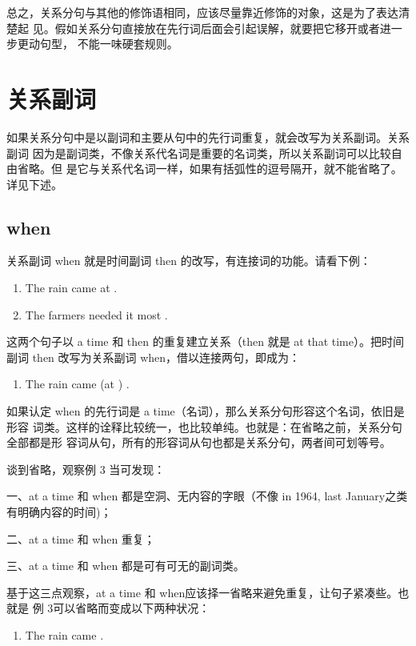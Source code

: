 总之，关系分句与其他的修饰语相同，应该尽量靠近修饰的对象，这是为了表达清楚起
见。假如关系分句直接放在先行词后面会引起误解，就要把它移开或者进一步更动句型，
不能一味硬套规则。

\section{关系副词}

如果关系分句中是以副词和主要从句中的先行词重复，就会改写为关系副词。关系副词
因为是副词类，不像关系代名词是重要的名词类，所以关系副词可以比较自由省略。但
是它与关系代名词一样，如果有括弧性的逗号隔开，就不能省略了。详见下述。

\subsection{when}

关系副词 when 就是时间副词 then 的改写，有连接词的功能。请看下例：

\begin{enumerate}
\item The rain came at .
\item The farmers needed it most .
\end{enumerate}
这两个句子以 a time 和 then 的重复建立关系（then 就是 at that time）。把时间
副词 then 改写为关系副词 when，借以连接两句，即成为：

\begin{enumerate}[resume]
\item The rain came (at ) .
\end{enumerate}
如果认定 when 的先行词是 a time（名词），那么关系分句形容这个名词，依旧是形容
词类。这样的诠释比较统一，也比较单纯。也就是：在省略之前，关系分句全部都是形
容词从句，所有的形容词从句也都是关系分句，两者间可划等号。

谈到省略，观察例 3 当可发现：

一、at a time 和 when 都是空洞、无内容的字眼（不像 in 1964, last January之类
有明确内容的时间)；

二、at a time 和 when 重复；

三、at a time 和 when 都是可有可无的副词类。

基于这三点观察，at a time 和 when应该择一省略来避免重复，让句子紧凑些。也就是
例 3可以省略而变成以下两种状况：

\begin{enumerate}[resume]
\item The rain came .
\end{enumerate}


